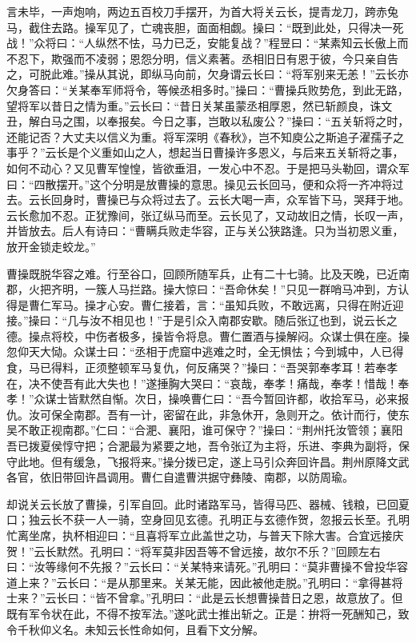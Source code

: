 言未毕，一声炮响，两边五百校刀手摆开，为首大将关云长，提青龙刀，跨赤兔马，截住去路。操军见了，亡魂丧胆，面面相觑。操曰：“既到此处，只得决一死战！”众将曰：“人纵然不怯，马力已乏，安能复战？”程昱曰：“某素知云长傲上而不忍下，欺强而不凌弱；恩怨分明，信义素著。丞相旧日有恩于彼，今只亲自告之，可脱此难。”操从其说，即纵马向前，欠身谓云长曰：“将军别来无恙！”云长亦欠身答曰：“关某奉军师将令，等候丞相多时。”操曰：“曹操兵败势危，到此无路，望将军以昔日之情为重。”云长曰：“昔日关某虽蒙丞相厚恩，然已斩颜良，诛文丑，解白马之围，以奉报矣。今日之事，岂敢以私废公？”操曰：“五关斩将之时，还能记否？大丈夫以信义为重。将军深明《春秋》，岂不知庾公之斯追子濯孺子之事乎？”云长是个义重如山之人，想起当日曹操许多恩义，与后来五关斩将之事，如何不动心？又见曹军惶惶，皆欲垂泪，一发心中不忍。于是把马头勒回，谓众军曰：“四散摆开。”这个分明是放曹操的意思。操见云长回马，便和众将一齐冲将过去。云长回身时，曹操已与众将过去了。云长大喝一声，众军皆下马，哭拜于地。云长愈加不忍。正犹豫间，张辽纵马而至。云长见了，又动故旧之情，长叹一声，并皆放去。后人有诗曰：“曹瞒兵败走华容，正与关公狭路逢。只为当初恩义重，放开金锁走蛟龙。”

曹操既脱华容之难。行至谷口，回顾所随军兵，止有二十七骑。比及天晚，已近南郡，火把齐明，一簇人马拦路。操大惊曰：“吾命休矣！”只见一群哨马冲到，方认得是曹仁军马。操才心安。曹仁接着，言：“虽知兵败，不敢远离，只得在附近迎接。”操曰：“几与汝不相见也！”于是引众入南郡安歇。随后张辽也到，说云长之德。操点将校，中伤者极多，操皆令将息。曹仁置酒与操解闷。众谋士俱在座。操忽仰天大恸。众谋士曰：“丞相于虎窟中逃难之时，全无惧怯；今到城中，人已得食，马已得料，正须整顿军马复仇，何反痛哭？”操曰：“吾哭郭奉孝耳！若奉孝在，决不使吾有此大失也！”遂捶胸大哭曰：“哀哉，奉孝！痛哉，奉孝！惜哉！奉孝！”众谋士皆默然自惭。次日，操唤曹仁曰：“吾今暂回许都，收拾军马，必来报仇。汝可保全南郡。吾有一计，密留在此，非急休开，急则开之。依计而行，使东吴不敢正视南郡。”仁曰：“合淝、襄阳，谁可保守？”操曰：“荆州托汝管领；襄阳吾已拨夏侯惇守把；合淝最为紧要之地，吾令张辽为主将，乐进、李典为副将，保守此地。但有缓急，飞报将来。”操分拨已定，遂上马引众奔回许昌。荆州原降文武各官，依旧带回许昌调用。曹仁自遣曹洪据守彝陵、南郡，以防周瑜。

却说关云长放了曹操，引军自回。此时诸路军马，皆得马匹、器械、钱粮，已回夏口；独云长不获一人一骑，空身回见玄德。孔明正与玄德作贺，忽报云长至。孔明忙离坐席，执杯相迎曰：“且喜将军立此盖世之功，与普天下除大害。合宜远接庆贺！”云长默然。孔明曰：“将军莫非因吾等不曾远接，故尔不乐？”回顾左右曰：“汝等缘何不先报？”云长曰：“关某特来请死。”孔明曰：“莫非曹操不曾投华容道上来？”云长曰：“是从那里来。关某无能，因此被他走脱。”孔明曰：“拿得甚将士来？”云长曰：“皆不曾拿。”孔明曰：“此是云长想曹操昔日之恩，故意放了。但既有军令状在此，不得不按军法。”遂叱武士推出斩之。正是：拚将一死酬知己，致令千秋仰义名。未知云长性命如何，且看下文分解。